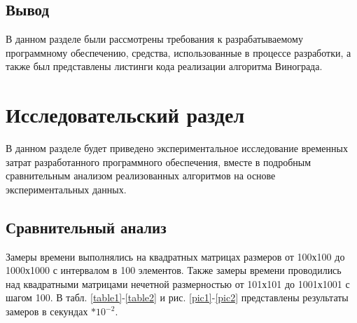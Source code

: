 \documentclass[12pt, a4paper]{report}
\begin{document}
	\newpage

	\section{Вывод}
	В данном разделе были рассмотрены требования к разрабатываемому программному обеспечению, средства, использованные в процессе разработки, а также был представлены листинги кода реализации алгоритма Винограда.

			
	\chapter{Исследовательский раздел}
	
	\vspace{-0.6cm}\hspace{0.5cm}В данном разделе будет приведено экспериментальное исследование временных затрат разработанного программного обеспечения, вместе в подробным сравнительным анализом реализованных алгоритмов на основе экспериментальных данных.
	
	\section{Сравнительный анализ}
	
	\hspace{0.6cm}Замеры времени выполнялись на квадратных матрицах размеров от 100х100 до 1000х1000 с интервалом в 100 элементов. Также замеры времени проводились над квадратными матрицами нечетной размерностью  от 101х101 до 1001х1001 с шагом 100. В табл. \ref{table1}-\ref{table2} и рис. \ref{pic1}-\ref{pic2} представлены результаты замеров в  секундах $ * 10^{-2}$.
	
	
	
\end{document}
